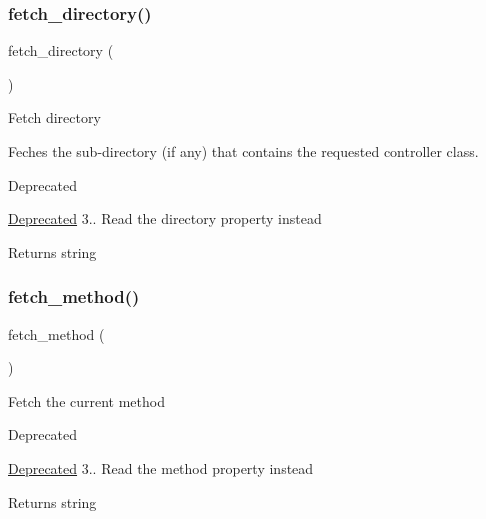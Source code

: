 \subsubsection{\texorpdfstring{fetch\+\_\+directory()}{fetch\_directory()}}
{\footnotesize\ttfamily fetch\+\_\+directory (\begin{DoxyParamCaption}{ }\end{DoxyParamCaption})}

Fetch directory

Feches the sub-\/directory (if any) that contains the requested controller class.

\begin{DoxyRefDesc}{Deprecated}
\item[\mbox{\hyperlink{deprecated__deprecated000005}{Deprecated}}]3.. Read the \textquotesingle{}directory\textquotesingle{} property instead \end{DoxyRefDesc}
\begin{DoxyReturn}{Returns}
string 
\end{DoxyReturn}
\mbox{\label{class_c_i___router_ad408b28e3a095e7435f21e95d93e7714}} 
\subsubsection{\texorpdfstring{fetch\+\_\+method()}{fetch\_method()}}
{\footnotesize\ttfamily fetch\+\_\+method (\begin{DoxyParamCaption}{ }\end{DoxyParamCaption})}

Fetch the current method

\begin{DoxyRefDesc}{Deprecated}
\item[\mbox{\hyperlink{deprecated__deprecated000004}{Deprecated}}]3.. Read the \textquotesingle{}method\textquotesingle{} property instead \end{DoxyRefDesc}
\begin{DoxyReturn}{Returns}
string 
\end{DoxyReturn}
\mbox{\label{class_c_i___router_afbb540df5c161fe69909a5f8182f910f}} 
